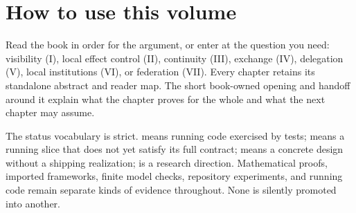 \documentclass[11pt,a4paper]{article}
\begin{document}
\begin{abstract}\noindent
Agentic development fails in a predictable way when concurrency grows faster
than accountability. More processes produce more work, but they also create more
unread evidence, more overlapping effects, more disposable identities, and more
ways for a confident report to outrun what actually happened. Better models do
not remove this institutional problem.

This book makes one claim: \emph{autonomy scales only when authority, evidence,
and consequence remain coupled at every effect boundary}. Seven independently
readable papers establish that claim in stages. They derive the information cost
of legible supervision; place one serial authority at the local write boundary;
bind work to a durable principal and outcome history; separate payment,
collateral, evidence, and settlement; prove that delegated capability only
narrows; connect witnessed acts to audit and bounded remedy; and state what may
cross between mutually distrustful machines without moving either machine's
sovereignty. The result is not a plea to trust agents. It is a design for making
trust unnecessary where structure can suffice, measurable where uncertainty
remains, and contestable everywhere else.
\end{abstract}

\section*{How to use this volume}
Read the book in order for the argument, or enter at the question you need:
visibility (I), local effect control (II), continuity (III), exchange (IV),
delegation (V), local institutions (VI), or federation (VII). Every chapter
retains its standalone abstract and reader map. The short book-owned opening and
handoff around it explain what the chapter proves for the whole and what the next
chapter may assume.

The status vocabulary is strict. \Built{} means running code exercised by tests;
\BuiltWeak{} means a running slice that does not yet satisfy its full contract;
\Designed{} means a concrete design without a shipping realization; \Vision{}
is a research direction. Mathematical proofs, imported frameworks, finite model
checks, repository experiments, and running code remain separate kinds of
evidence throughout. None is silently promoted into another.

\begingroup\small\sloppy\tableofcontents\endgroup\clearpage
\end{document}
